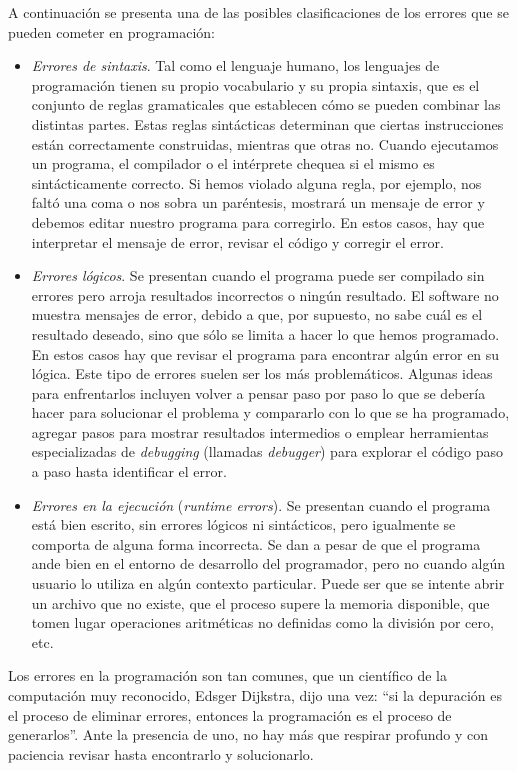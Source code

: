 \documentclass[
]{book}
\begin{document}
A continuación se presenta una de las posibles clasificaciones de los errores que se pueden cometer en programación:

\begin{itemize}
\item
  \emph{Errores de sintaxis}. Tal como el lenguaje humano, los lenguajes de programación tienen su propio vocabulario y su propia sintaxis, que es el conjunto de reglas gramaticales que establecen cómo se pueden combinar las distintas partes. Estas reglas sintácticas determinan que ciertas instrucciones están correctamente construidas, mientras que otras no. Cuando ejecutamos un programa, el compilador o el intérprete chequea si el mismo es sintácticamente correcto. Si hemos violado alguna regla, por ejemplo, nos faltó una coma o nos sobra un paréntesis, mostrará un mensaje de error y debemos editar nuestro programa para corregirlo. En estos casos, hay que interpretar el mensaje de error, revisar el código y corregir el error.
\item
  \emph{Errores lógicos}. Se presentan cuando el programa puede ser compilado sin errores pero arroja resultados incorrectos o ningún resultado. El software no muestra mensajes de error, debido a que, por supuesto, no sabe cuál es el resultado deseado, sino que sólo se limita a hacer lo que hemos programado. En estos casos hay que revisar el programa para encontrar algún error en su lógica. Este tipo de errores suelen ser los más problemáticos. Algunas ideas para enfrentarlos incluyen volver a pensar paso por paso lo que se debería hacer para solucionar el problema y compararlo con lo que se ha programado, agregar pasos para mostrar resultados intermedios o emplear herramientas especializadas de \emph{debugging} (llamadas \emph{debugger}) para explorar el código paso a paso hasta identificar el error.
\item
  \emph{Errores en la ejecución} (\emph{runtime errors}). Se presentan cuando el programa está bien escrito, sin errores lógicos ni sintácticos, pero igualmente se comporta de alguna forma incorrecta. Se dan a pesar de que el programa ande bien en el entorno de desarrollo del programador, pero no cuando algún usuario lo utiliza en algún contexto particular. Puede ser que se intente abrir un archivo que no existe, que el proceso supere la memoria disponible, que tomen lugar operaciones aritméticas no definidas como la división por cero, etc.
\end{itemize}

Los errores en la programación son tan comunes, que un científico de la computación muy reconocido, Edsger Dijkstra, dijo una vez: ``si la depuración es el proceso de eliminar errores, entonces la programación es el proceso de generarlos''. Ante la presencia de uno, no hay más que respirar profundo y con paciencia revisar hasta encontrarlo y solucionarlo.
\end{document}
